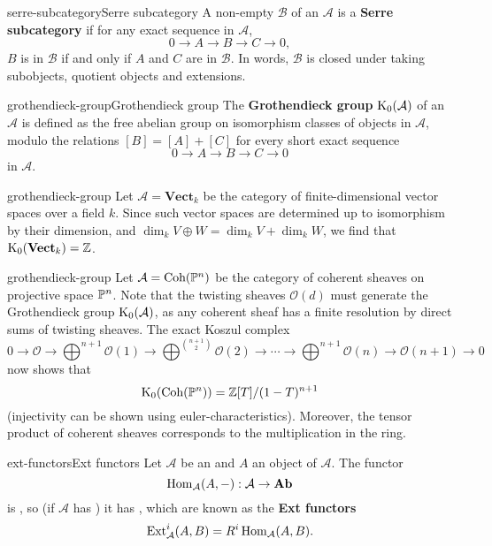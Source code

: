 \begin{topic}{serre-subcategory}{Serre subcategory}
    A non-empty  $\mathcal{B}$ of an  $\mathcal{A}$ is a \textbf{Serre subcategory} if for any exact sequence in $\mathcal{A}$,
    \[ 0 \to A \to B \to C \to 0 , \]
    $B$ is in $\mathcal{B}$ if and only if $A$ and $C$ are in $\mathcal{B}$. In words, $\mathcal{B}$ is closed under taking subobjects, quotient objects and extensions.
\end{topic}

\begin{topic}{grothendieck-group}{Grothendieck group}
    The \textbf{Grothendieck group} $\textup{K}_0(\mathcal{A})$ of an  $\mathcal{A}$ is defined as the free abelian group on isomorphism classes of objects in $\mathcal{A}$, modulo the relations $[B] = [A] + [C]$ for every short exact sequence
    \[ 0 \to A \to B \to C \to 0 \]
    in $\mathcal{A}$.
\end{topic}

\begin{example}{grothendieck-group}
    Let $\mathcal{A} = \textbf{Vect}_k$ be the category of finite-dimensional vector spaces over a field $k$. Since such vector spaces are determined up to isomorphism by their dimension, and $\dim_k V \oplus W = \dim_k V + \dim_k W$, we find that $\textup{K}_0(\textbf{Vect}_k) = \mathbb{Z}$.
\end{example}

\begin{example}{grothendieck-group}
    Let $\mathcal{A} = \textup{Coh}(\mathbb{P}^n)$ be the category of coherent sheaves on projective space $\mathbb{P}^n$. Note that the twisting sheaves $\mathcal{O}(d)$ must generate the Grothendieck group $\textup{K}_0(\mathcal{A})$, as any coherent sheaf has a finite resolution by direct sums of twisting sheaves. The exact Koszul complex
    \[ 0 \to \mathcal{O} \to \bigoplus^{n + 1} \mathcal{O}(1) \to \bigoplus^{\binom{n + 1}{2}} \mathcal{O}(2) \to \cdots \to \bigoplus^{n + 1} \mathcal{O}(n) \to \mathcal{O}(n + 1) \to 0 \]
    now shows that
    \[ \textup{K}_0(\textup{Coh}(\mathbb{P}^n)) = \mathbb{Z}[T] / (1 - T)^{n + 1} \]
    (injectivity can be shown using euler-characteristics). Moreover, the tensor product of coherent sheaves corresponds to the multiplication in the ring.
\end{example}

\begin{topic}{ext-functors}{Ext functors}
    Let $\mathcal{A}$ be an  and $A$ an object of $\mathcal{A}$. The functor
    \[ \operatorname{Hom}_{\mathcal{A}}(A, -) : \mathcal{A} \to \textbf{Ab} \]
    is , so (if $\mathcal{A}$ has ) it has , which are known as the \textbf{Ext functors}
    \[ \textup{Ext}^i_\mathcal{A}(A, B) = R^i \operatorname{Hom}_\mathcal{A}(A, B) . \]
\end{topic}


